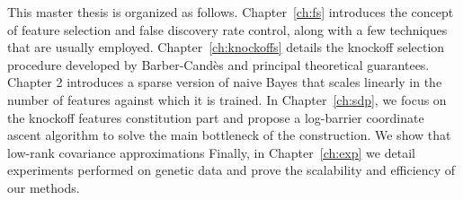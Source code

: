 This master thesis is organized as follows.
Chapter~\ref{ch:fs} introduces the concept of feature selection and
false discovery rate control, along with a few techniques that are usually employed.
Chapter~\ref{ch:knockoffs} details the knockoff selection procedure developed by Barber-Candès
and principal theoretical guarantees.
Chapter 2 introduces a sparse version of naive Bayes that scales linearly in the number of features against which
it is trained.
In Chapter~\ref{ch:sdp},
we focus on the knockoff features constitution part
and propose a log-barrier coordinate ascent algorithm to solve the main bottleneck of the construction.
We show that low-rank covariance approximations
Finally, in Chapter~\ref{ch:exp} we detail experiments performed on genetic data and prove the scalability
and efficiency of our methods.

